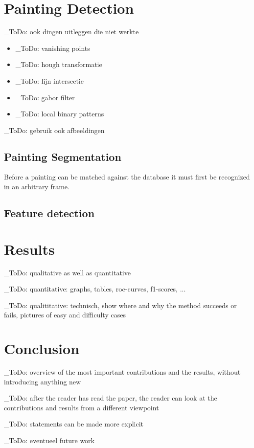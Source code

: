 \documentclass[10pt,final,journal]{IEEEtran}
\newcommand{\todo}[1]{\color{red}\_ToDo: #1 \color{black}}
\begin{document}
	\section{Painting Detection}
	\todo{ook dingen uitleggen die niet werkte}
	\begin{itemize}
		\item \todo{vanishing points}
		\item \todo{hough transformatie}
		\item \todo{lijn intersectie}
		\item \todo{gabor filter}
		\item \todo{local binary patterns}
	\end{itemize}

	\todo{gebruik ook afbeeldingen}
	\lipsum[6]
	
	\subsection{Painting Segmentation}
	Before a painting can be matched against the database it must first be recognized in an arbitrary frame. 
	
	\subsection{Feature detection}
	\lipsum[12-15]
	\section{Results}
	\todo{qualitative as well as quantitative}
	
	\todo{quantitative: graphs, tables, roc-curves, f1-scores, ...}
	
	\todo{qualititative: technisch, show where and why the method succeeds or fails, pictures of easy and difficulty cases}
	\lipsum[16-18]
	\section{Conclusion}
	\todo{overview of the most important contributions and the results, without introducing anything new}
	
	\todo{after the reader has read the paper, the reader can look at the contributions and results from a different viewpoint}
	
	\todo{statements can be made more explicit}
	
	\todo{eventueel future work}
	\lipsum[19]

	
	
\end{document}
